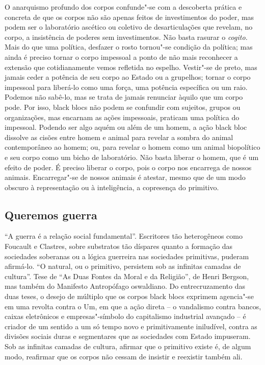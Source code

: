 O anarquismo profundo dos corpos confunde"-se com a descoberta prática e
concreta de que os corpos não são apenas feitos de investimentos do
poder, mas podem ser o laboratório ascético ou coletivo de
desarticulações que revelam, no corpo, a insistência de poderes sem
investimentos. Não basta rasurar o \emph{cogito. }Mais do que uma
política, desfazer o rosto tornou"-se condição da política; mas ainda é
preciso tornar o corpo impessoal a ponto de não mais reconhecer a
extensão que cotidianamente vemos refletida no espelho. Vestir"-se de
preto, mas jamais ceder a potência de seu corpo ao Estado ou a
grupelhos; tornar o corpo impessoal para liberá-lo como uma força, uma
potência específica ou um raio. Podemos não sabê-lo, mas se trata de
jamais renunciar àquilo que um corpo pode. Por isso, black blocs não
podem se confundir com sujeitos, grupos ou organizações, mas encarnam as
ações impessoais, praticam uma política do impessoal. Podendo ser algo
aquém ou além de um homem, a ação black bloc dissolve as cisões entre
homem e animal para revelar a sombra do animal contemporâneo ao homem;
ou, para revelar o homem como um animal biopolítico e seu corpo como um
bicho de laboratório. Não basta liberar o homem, que é um efeito de
poder. É preciso liberar o corpo, pois o corpo nos encarrega de nossos
animais. Encarregar"-se de nossos animais é atestar, mesmo que de um modo
obscuro à representação ou à inteligência, a copresença do primitivo.

\subsection{Queremos guerra}

``A guerra é a relação social fundamental''.
Escritores tão heterogêneos como Foucault e Clastres, sobre substratos
tão díspares quanto a formação das sociedades soberanas ou a lógica
guerreira nas sociedades primitivas, puderam afirmá-lo. ``O natural, ou
o primitivo, persistem sob as infinitas camadas de cultura''. Tese de
``As Duas Fontes da Moral e da Religião'', de Henri Bergson, mas também
do Manifesto Antropófago oswaldiano. Do entrecruzamento das duas teses,
o desejo de múltiplo que os corpos black blocs exprimem agencia"-se em
uma revolta contra o Um, em que a ação direta -- o vandalismo contra
bancos, caixas eletrônicos e empresas"-símbolo do capitalismo industrial
avançado -- é criador de um sentido a um só tempo novo e primitivamente
iniludível, contra as divisões sociais duras e segmentares que as
sociedades com Estado impuseram. Sob as infinitas camadas de cultura,
afirmar que o primitivo existe é, de algum modo, reafirmar que os corpos
não cessam de insistir e reexistir também ali.

